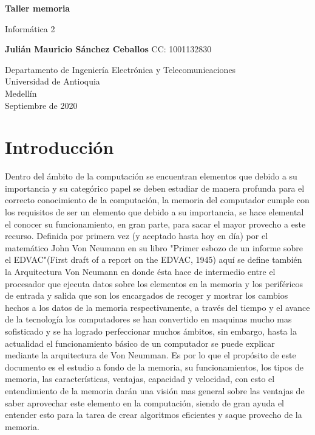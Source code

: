 \documentclass{article}
\begin{document}
\begin{titlepage}
    \begin{center}
        \vspace*{1cm}
            
        \Huge
        \textbf{Taller memoria}
            
        \vspace{0.5cm}
        \LARGE
        Informática 2
            
        \vspace{1.5cm}
            
        \textbf{Julián Mauricio Sánchez Ceballos}
         \newline 
            CC: 1001132830   
        \vfill
            
        \vspace{0.8cm}
            
        \Large
        Departamento de Ingeniería Electrónica y Telecomunicaciones\\
        Universidad de Antioquia\\
        Medellín\\
        Septiembre de 2020
            
    \end{center}
\end{titlepage}
\tableofcontents

\newpage
\section{Introducción}
Dentro del ámbito de la computación se encuentran elementos que debido a su importancia y su categórico papel se deben estudiar de manera profunda para el correcto conocimiento de la computación, la memoria del computador cumple con los requisitos de ser un elemento que debido a su importancia, se hace elemental el conocer su funcionamiento, en gran parte, para sacar el mayor provecho a este recurso. Definida por primera vez (y aceptado hasta hoy en día) por el matemático John Von Neumann en su libro "Primer esbozo de un informe sobre el EDVAC"(First draft of a report on the EDVAC, 1945) aquí se define también la Arquitectura Von Neumann en donde ésta hace de intermedio entre el procesador que ejecuta datos sobre los elementos en la memoria y los periféricos de entrada y salida que son los encargados de recoger y mostrar los cambios hechos a los datos de la memoria respectivamente, a través del tiempo y el avance de la tecnología los computadores se han convertido en maquinas mucho mas sofisticado y se ha logrado perfeccionar muchos ámbitos, sin embargo, hasta la actualidad el funcionamiento básico de un computador se puede explicar mediante la arquitectura de Von Neumman. Es por lo que el propósito de este documento es el estudio a fondo de la memoria, su funcionamientos, los tipos de memoria, las características, ventajas, capacidad y velocidad, con esto el entendimiento de la memoria darán una visión mas general sobre las ventajas de saber aprovechar este elemento en la computación, siendo de gran ayuda el entender esto para la tarea de crear algoritmos eficientes y saque provecho de la memoria. 
\end{document}
